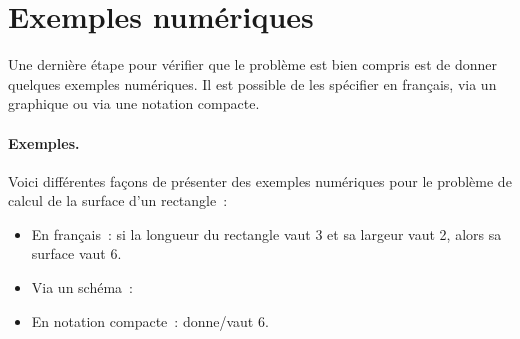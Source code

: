 	\section{Exemples numériques}
	
		Une dernière étape pour vérifier que le problème
		est bien compris est de donner quelques exemples numériques.
		Il est possible de les spécifier en français, 
		via un graphique ou via une notation compacte.

		\begin{Emphase}
			\paragraph{Exemples.}
			Voici différentes façons de présenter des exemples numériques
			pour le problème de calcul de la surface d’un rectangle~:
			\begin{itemize}
			\item En français~: 
				si la longueur du rectangle vaut 3 et sa largeur vaut 2, 
				alors sa surface vaut 6.			
			\item Via un schéma~:	
				\begin{center}
				\end{center}
			\item En notation compacte~:
				 donne/vaut $6$.
			\end{itemize}
		\end{Emphase}
	
